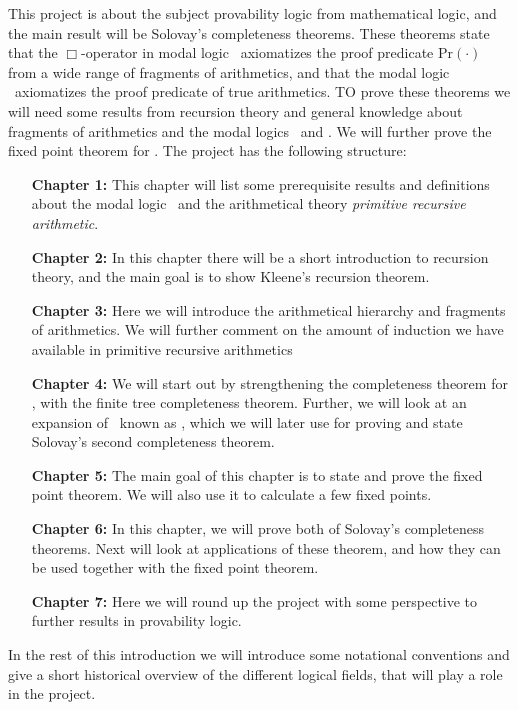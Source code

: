 \documentclass[../main.tex]{subfiles}
\begin{document}
This project is about the subject provability logic from mathematical logic,
and the main result will be Solovay's completeness theorems. These theorems
state that the $\Box$-operator in  modal logic \GL\  axiomatizes the proof
predicate $\text{Pr}(\cdot)$ from a wide range of fragments of arithmetics, and
that the modal logic \GLS\ axiomatizes the proof predicate of true arithmetics.
TO prove these theorems we will need some results from recursion theory and
general knowledge about fragments of arithmetics and the modal logics \GL\ and
\GLS. We will further prove the fixed point theorem for \GL.
The project has the following structure: 
\begin{enumerate}
	\item[\textbf{Chapter 1:}] This chapter will list some prerequisite results and
		definitions about the modal logic \GL\ and the arithmetical
		theory  \textit{primitive
		recursive arithmetic}. 
	\item[\textbf{Chapter 2:}] In this chapter there will be a short introduction to recursion
		theory, and the main goal is to show Kleene's recursion theorem.
	\item[\textbf{Chapter 3:}] Here we will introduce the arithmetical hierarchy and
		fragments of arithmetics. We will further comment on the amount
		of induction we have available in primitive recursive
		arithmetics
	\item[\textbf{Chapter 4:}] We will start out by strengthening the completeness
		theorem for \GL, with the finite tree completeness theorem.
		Further, we will look at an expansion of \GL\ known as \GLS,
		which we will later use  for proving and state Solovay's second completeness
		theorem.
	\item[\textbf{Chapter 5:}] The main goal of this chapter is to state and prove
		the fixed point theorem. We will also use it to calculate a few fixed
		points.
	\item[\textbf{Chapter 6:}] In this chapter, we will prove both of Solovay's
		completeness theorems. Next will look
		at applications of these theorem, and how they can be used
		together with the fixed point theorem.
	\item[\textbf{Chapter 7:}] Here we will round up the project with some
		perspective to further results in provability logic.
\end{enumerate}

In the rest of this introduction we will introduce some notational
conventions and give a short historical overview of the different logical
fields, that will play a role in the project.
\end{document}
